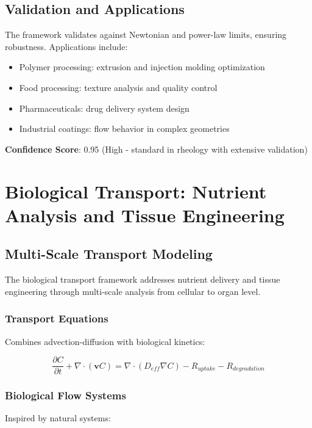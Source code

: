 \documentclass[11pt,a4paper]{article}
\begin{document}
\subsection{Validation and Applications}

The framework validates against Newtonian and power-law limits, ensuring robustness. Applications include:

\begin{itemize}
    \item Polymer processing: extrusion and injection molding optimization
    \item Food processing: texture analysis and quality control
    \item Pharmaceuticals: drug delivery system design
    \item Industrial coatings: flow behavior in complex geometries
\end{itemize}

\textbf{Confidence Score}: 0.95 (High - standard in rheology with extensive validation)

\section{Biological Transport: Nutrient Analysis and Tissue Engineering}
\label{sec:biological}

\subsection{Multi-Scale Transport Modeling}

The biological transport framework addresses nutrient delivery and tissue engineering through multi-scale analysis from cellular to organ level.

\subsubsection{Transport Equations}
Combines advection-diffusion with biological kinetics:

\begin{equation}
\frac{\partial C}{\partial t} + \nabla \cdot (\mathbf{v}C) = \nabla \cdot (D_{eff} \nabla C) - R_{uptake} - R_{degradation}
\label{eq:transport}
\end{equation}

\subsubsection{Biological Flow Systems}
Inspired by natural systems:
\end{document}
